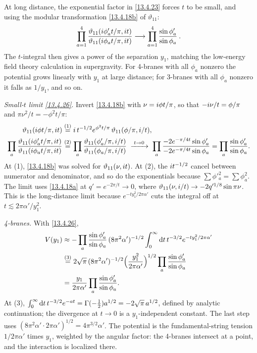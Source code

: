 At long distance, the exponential factor in \eqref{13.4.23} forces $t$ to be small, and using the modular transformation \eqref{13.4.18b} of $\vartheta_{11}$:
\begin{equation}
	\prod_{a=1}^4 \frac{\vartheta_{11}(i\phi_a' t/\pi, i t)}{\vartheta_{11}(i\phi_a t/\pi, i t)} \longrightarrow \prod_{a=1}^4 \frac{\sin\phi_a'}{\sin\phi_a} \:. \label{13.4.26}
\end{equation}
The $t$-integral then gives a power of the separation $y_1$, matching the low-energy field theory calculation in supergravity. For 4-branes with all $\phi_a$ nonzero the potential grows linearly with $y_1$ at large distance; for 3-branes with all $\phi_a$ nonzero it falls as $1/y_1$, and so on.
\begin{tcolorbox}[breakable]
	\begin{remark}
		\textit{Small-$t$ limit \eqref{13.4.26}.} Invert \eqref{13.4.18b} with $\nu=i\phi t/\pi$, so that $-i\nu/t=\phi/\pi$ and $\pi\nu^2/t=-\phi^2t/\pi$:
		\begin{align*}
			\vartheta_{11}(i\phi t/\pi,i t) &\overset{(1)}{=} i\,t^{-1/2}e^{\phi^2t/\pi}\,\vartheta_{11}(\phi/\pi,i/t),\\
			\prod_a\frac{\vartheta_{11}(i\phi'_at/\pi,i t)}{\vartheta_{11}(i\phi_at/\pi,i t)} &\overset{(2)}{=} \prod_a\frac{\vartheta_{11}(\phi'_a/\pi,i/t)}{\vartheta_{11}(\phi_a/\pi,i/t)}
			\;\xrightarrow{\;t\to0\;}\; \prod_a\frac{-2e^{-\pi/4t}\sin\phi'_a}{-2e^{-\pi/4t}\sin\phi_a} = \prod_a\frac{\sin\phi'_a}{\sin\phi_a} .
		\end{align*}
		At (1), \eqref{13.4.18b} was solved for $\vartheta_{11}(\nu,i t)$. At (2), the $i t^{-1/2}$ cancel between numerator and denominator, and so do the exponentials because $\sum\phi'^2_a=\sum\phi_a^2$. The limit uses \eqref{13.4.18a} at $q'=e^{-2\pi/t}\to0$, where $\vartheta_{11}(\nu,i/t)\to-2q'^{1/8}\sin\pi\nu$. This is the long-distance limit because $e^{-ty_1^2/2\pi\alpha'}$ cuts the integral off at $t\lesssim2\pi\alpha'/y_1^2$.

		\textit{4-branes.} With \eqref{13.4.26},
		\begin{align*}
			V(y_1) &\approx -\prod_a\frac{\sin\phi'_a}{\sin\phi_a}\,(8\pi^2\alpha')^{-1/2}\int_0^\infty\mathrm{d} t\,t^{-3/2}e^{-ty_1^2/2\pi\alpha'}\\
			&\overset{(3)}{=} 2\sqrt\pi\,(8\pi^2\alpha')^{-1/2}\Bigl(\frac{y_1^2}{2\pi\alpha'}\Bigr)^{1/2}\prod_a\frac{\sin\phi'_a}{\sin\phi_a}\\
			&= \frac{y_1}{2\pi\alpha'}\prod_a\frac{\sin\phi'_a}{\sin\phi_a} .
		\end{align*}
		At (3), $\int_0^\infty\mathrm{d} t\,t^{-3/2}e^{-at}=\Gamma(-\frac12)a^{1/2}=-2\sqrt\pi\,a^{1/2}$, defined by analytic continuation; the divergence at $t\to0$ is a $y_1$-independent constant. The last step uses $(8\pi^2\alpha'\cdot2\pi\alpha')^{1/2}=4\pi^{3/2}\alpha'$. The potential is the fundamental-string tension $1/2\pi\alpha'$ times $y_1$, weighted by the angular factor: the 4-branes intersect at a point, and the interaction is localized there.


\end{remark}
\end{tcolorbox}
